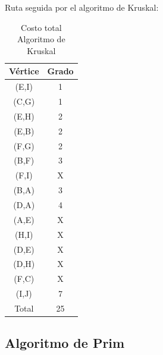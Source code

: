 Ruta seguida por el algoritmo de Kruskal:
\begin{table}[H]
    \centering
    \begin{tabular}{|c|c|}
        \hline
        Vértice & Grado \\
        \hline
        (E,I) & 1 \\
        (C,G) & 1 \\
        (E,H) & 2 \\
        (E,B) & 2 \\
        (F,G) & 2 \\
        (B,F) & 3 \\
        (F,I) & X \\
        (B,A) & 3 \\
        (D,A) & 4 \\
        (A,E) & X \\
        (H,I) & X \\
        (D,E) & X \\
        (D,H) & X \\
        (F,C) & X \\
        (I,J) & 7 \\
        \hline
        Total & 25 \\
        \hline
    \end{tabular}
    \caption{Costo total Algoritmo de Kruskal}\label{tab:grados_vertices}
\end{table}

\subsection{Algoritmo de Prim}

